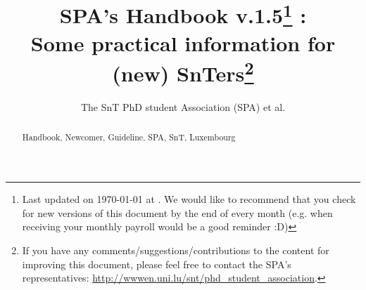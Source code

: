 \documentclass[runningheads,a4paper]{llncs}
\newcommand{\keywords}[1]{\par\addvspace\baselineskip
\noindent\keywordname\enspace\ignorespaces#1}
\newcommand{\SAPcv}{1.5}
\begin{document}
\mainmatter  %

\title{SPA's Handbook v.\SAPcv\thanks{Last updated on \ukvardate\today\xspace at \currenttime.
We would like to recommend that you check for new versions of this document by the end of every month (e.g. when receiving your monthly payroll would be a good reminder :D)} : \\
Some practical information for (new) SnTers\thanks{If you have any comments/suggestions/contributions to the content for improving this document, please feel free to contact the SPA's representatives: \url{http://wwwen.uni.lu/snt/phd_student_association}.}}


\author{The SnT PhD student Association (SPA) et al.
}
%

\maketitle

\begin{abstract}


\keywords{Handbook, Newcomer, Guideline, SPA, SnT, Luxembourg}
\end{abstract}

\setcounter{secnumdepth}{2}
\setcounter{tocdepth}{2}
\begin{spacing}{1.3}
\tableofcontents
\end{spacing}

\newpage

\graphicspath{{Figs/PNG/}{Figs/PDF/}{Figs/}}











%








\end{document}
